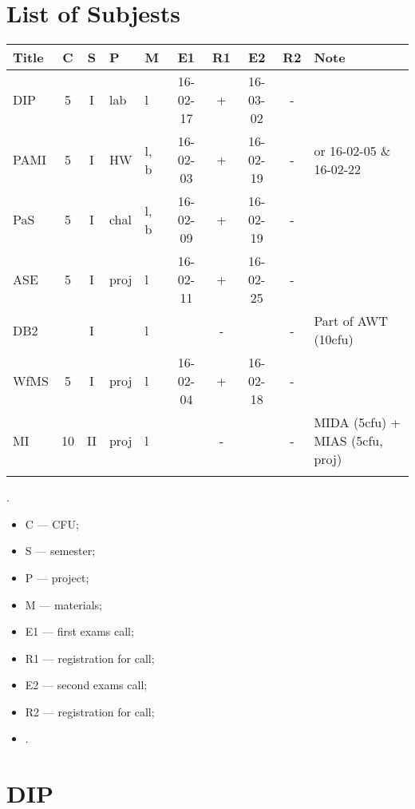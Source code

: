 \documentclass[a4paper,12pt]{article} %
\begin{document}
\tableofcontents

\newpage
\section{List of Subjests}
\begin{tabularx}{\textwidth}{|l|c|c|l|l|c|c|c|c|X|}
	\hline
	Title & C & S & P & M & E1 & R1 & E2 & R2 & Note \\
	\hline
	DIP & 5 & I & lab & l & 16-02-17 & + & 16-03-02 & - &  \\
	\hline
	PAMI & 5 & I & HW & l, b & 16-02-03 & + & 16-02-19 & - & or 16-02-05 \& 16-02-22\\
	\hline
	PaS & 5 & I & chal & l, b & 16-02-09 & + & 16-02-19 & - &  \\
	\hline
	ASE & 5 & I & proj & l & 16-02-11 & + & 16-02-25 & - &  \\
	\hline
	DB2 &  & I &  & l & & - & & - & Part of AWT (10cfu) \\
	\hline
	WfMS & 5 & I & proj & l & 16-02-04 & + & 16-02-18 & - &  \\
	\hline
	MI & 10 & II & proj & l & & - & & - & MIDA (5cfu) + MIAS (5cfu, proj) \\
	\hline
	&  &  &  &  &  & & & &  \\
	\hline
\end{tabularx}

.\\

\begin{itemize}
	\item C --- CFU;
	\item S --- semester;
	\item P --- project;
	\item M --- materials;
	\item E1 --- first exams call;
	\item R1 --- registration for call;
	\item E2 --- second exams call;
	\item R2 --- registration for call;
	\item .
\end{itemize}

\newpage
\section{DIP}
\end{document}
